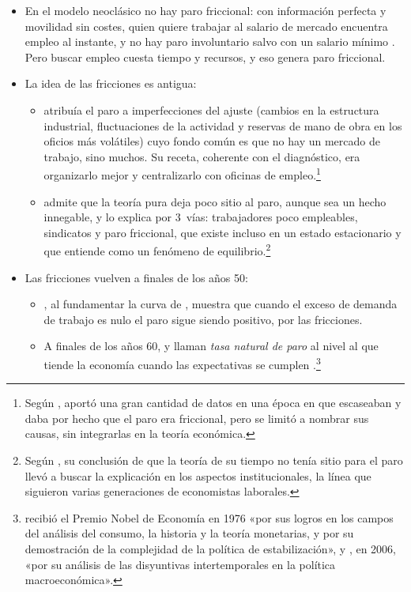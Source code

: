 \documentclass[11pt]{article}
\begin{document}
\begin{itemize}
\item En el modelo neoclásico no hay paro friccional: con información perfecta y movilidad sin costes, quien quiere trabajar al salario de mercado encuentra empleo al instante, y no hay paro involuntario salvo con un salario mínimo . Pero buscar empleo cuesta tiempo y recursos, y eso genera paro friccional.
\item La idea de las fricciones es antigua:
  \begin{itemize}
  \item \textcite{Beveridge1909Unemployment} atribuía el paro a imperfecciones del ajuste (cambios en la estructura industrial, fluctuaciones de la actividad y reservas de mano de obra en los oficios más volátiles) cuyo fondo común es que no hay un mercado de trabajo, sino muchos. Su receta, coherente con el diagnóstico, era organizarlo mejor y centralizarlo con oficinas de empleo.\footnote{Según \textcite[pp.~14-15]{DeVroey2016History},  aportó una gran cantidad de datos en una época en que escaseaban y daba por hecho que el paro era friccional, pero se limitó a nombrar sus causas, sin integrarlas en la teoría económica.}
  \item \textcite{Hicks1932Theory} admite que la teoría pura deja poco sitio al paro, aunque sea un hecho innegable, y lo explica por 3~vías: trabajadores poco empleables, sindicatos y paro friccional, que existe incluso en un estado estacionario y que entiende como un fenómeno de equilibrio.\footnote{Según \textcite[p.~15]{DeVroey2016History}, su conclusión de que la teoría de su tiempo no tenía sitio para el paro llevó a buscar la explicación en los aspectos institucionales, la línea que siguieron varias generaciones de economistas laborales.}
  \end{itemize}
\item Las fricciones vuelven a finales de los años 50:
  \begin{itemize}
  \item \textcite{Lipsey1960Relation}, al fundamentar la curva de , muestra que cuando el exceso de demanda de trabajo es nulo el paro sigue siendo positivo, por las fricciones.
  \item A finales de los años 60, \textcite{Phelps1967Phillips} y \textcite{Friedman1968Role} llaman \emph{tasa natural de paro} al nivel al que tiende la economía cuando las expectativas se cumplen  .\footnote{ recibió el Premio Nobel de Economía en 1976 «por sus logros en los campos del análisis del consumo, la historia y la teoría monetarias, y por su demostración de la complejidad de la política de estabilización»\nocite{Nobel1976Friedman}, y , en 2006, «por su análisis de las disyuntivas intertemporales en la política macroeconómica»\nocite{Nobel2006Phelps}.}

\end{itemize}
\end{itemize}
\end{document}
